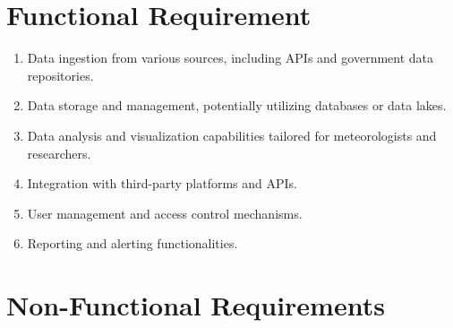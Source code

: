 \section{Functional Requirement}

\begin{enumerate}
  \item Data ingestion from various sources, including APIs and government data
  repositories.
  \item Data storage and management, potentially utilizing databases or data
  lakes.
  \item Data analysis and visualization capabilities tailored for meteorologists
  and researchers.
  \item Integration with third-party platforms and APIs.
  \item User management and access control mechanisms.
  \item Reporting and alerting functionalities.
\end{enumerate}

\section{Non-Functional Requirements}

